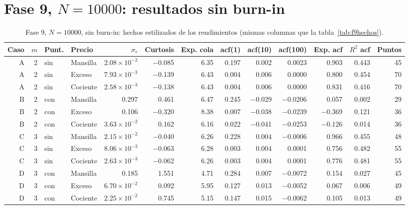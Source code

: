 \documentclass[11pt,letterpaper]{article}
\begin{document}
\section{Fase 9, $N=10000$: resultados sin burn-in}\label{ap:sinburnin}
\begin{table}[H]
\centering
\footnotesize
\setlength{\tabcolsep}{3.5pt}
\caption{Fase 9, $N=10000$, sin burn-in: hechos estilizados de los rendimientos (mismas columnas que la tabla~\ref{tab:f9hechos}).}\label{tab:f9hechossin}
\begin{adjustbox}{max width=\textwidth}
\begin{tabular}{rrllrrrrrrrrr}
\toprule
Caso & $m$ & Punt. & Precio & $\sigma_r$ & Curtosis & Exp. cola & acf(1) & acf(10) & acf(100) & Exp. acf & $R^2$ acf & Puntos \\
\midrule
A & 2 & sin & Mansilla & $2.08\times10^{-2}$ & $-$0.085 & 6.35 & 0.197 & 0.002 & 0.0023 & 0.903 & 0.443 & 45 \\
A & 2 & sin & Exceso & $7.93\times10^{-3}$ & $-$0.139 & 6.43 & 0.004 & 0.006 & 0.0000 & 0.800 & 0.454 & 70 \\
A & 2 & sin & Cociente & $2.58\times10^{-3}$ & $-$0.138 & 6.43 & 0.004 & 0.006 & 0.0000 & 0.831 & 0.416 & 70 \\
B & 2 & con & Mansilla & 0.297 & 0.461 & 6.47 & 0.245 & $-$0.029 & $-$0.0206 & 0.057 & 0.002 & 29 \\
B & 2 & con & Exceso & 0.106 & $-$0.320 & 8.38 & 0.007 & $-$0.038 & $-$0.0239 & $-$0.369 & 0.121 & 36 \\
B & 2 & con & Cociente & $3.63\times10^{-2}$ & 0.162 & 6.16 & 0.022 & $-$0.041 & $-$0.0253 & $-$0.126 & 0.014 & 36 \\
C & 3 & sin & Mansilla & $2.15\times10^{-2}$ & $-$0.040 & 6.26 & 0.228 & 0.004 & $-$0.0006 & 0.966 & 0.455 & 48 \\
C & 3 & sin & Exceso & $8.06\times10^{-3}$ & $-$0.063 & 6.28 & 0.003 & 0.004 & 0.0001 & 0.756 & 0.482 & 55 \\
C & 3 & sin & Cociente & $2.63\times10^{-3}$ & $-$0.062 & 6.26 & 0.003 & 0.004 & 0.0001 & 0.776 & 0.481 & 55 \\
D & 3 & con & Mansilla & 0.185 & 1.551 & 4.71 & 0.284 & 0.007 & $-$0.0072 & 0.154 & 0.027 & 45 \\
D & 3 & con & Exceso & $6.70\times10^{-2}$ & 0.092 & 5.95 & 0.127 & 0.013 & $-$0.0052 & 0.067 & 0.006 & 49 \\
D & 3 & con & Cociente & $2.25\times10^{-2}$ & 0.745 & 5.15 & 0.147 & 0.015 & $-$0.0062 & 0.105 & 0.013 & 49 \\

\end{tabular}
\end{adjustbox}
\end{table}
\end{document}
